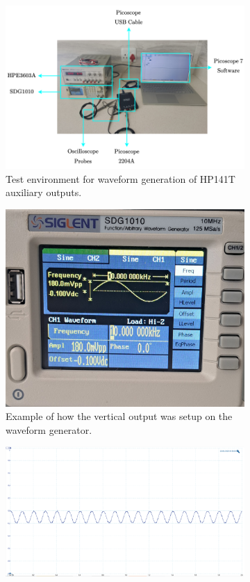 \documentclass[class=report,11pt,crop=false]{standalone}
\begin{document}
	\begin{figure}[h!]
		\centering
		\begin{subfigure}{.33\textwidth}
			\centering
			\includegraphics[width=1.1\linewidth]{Figures/Results/hp141t-test-environment.png}
			\caption{Test environment for waveform generation of HP141T auxiliary outputs.}
			\label{fig:hp141t-test-environment}
		\end{subfigure}%
		\begin{subfigure}{.33\textwidth}
			\centering
			\includegraphics[width=0.55\linewidth]{Figures/Results/hp141t-002Vpp-SDG-shot}
			\caption{Example of how the vertical output was setup on the waveform generator.}
			\label{fig:hp141t-002Vpp-SDG-shot}
		\end{subfigure}
		\begin{subfigure}{.33\textwidth}
			\centering
			\includegraphics[width=1.0\linewidth]{Figures/Results/hp141t-02Vpp-10kHz}

\end{subfigure}
\end{figure}
\end{document}
